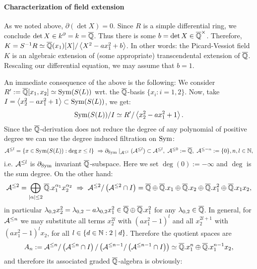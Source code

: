 \paragraph{Characterization of field extension}
\bn
\item As we noted above, $\partial(\det X) = 0$. Since $R$ is a simple differential ring, we conclude $\det X \in k^\partial = k = \overline{\mathbb{Q}}$. Thus there is some $b = \det X \in \overline{\mathbb{Q}}^\times$. Therefore, $K = S^{-1}R \simeq \overline{\mathbb{Q}}(x_1)[X]/\left<X^2 - a x_1^2 + b\right>$. In other words: the Picard-Vessiot field $K$ is an algebraic extension of (some appropriate) transcendental extension of $\overline{\mathbb{Q}}$. Rescaling our differential equation, we may assume that $b = 1$.
\item An immediate consequence of the above is the following: We consider $R' := \overline{\mathbb{Q}}[x_1,x_2] \simeq \mathrm{Sym}(S(L))$ wrt. the $\overline{\mathbb{Q}}$-basis $\{x_i : i = 1,2\}$. Now, take $I = \left<x_2^2 - a x_1^2 + 1\right> \subset \mathrm{Sym}(S(L))$, we get:
$$\mathrm{Sym}(S(L))/I \simeq R'/\left<x_2^2 - a x_1^2 + 1\right>.$$
Since the $\overline{\mathbb{Q}}$-derivation does not reduce the degree of any polynomial of positive degree we can use the degree induced filtration on $\mathrm{Sym}$:
$$\filteredA^{\leq l} = \left\{x \in \trm{Sym}(S(L)) : \deg x \leq l\right\} \ \RA \partial_{\trm{Sym}}\mid_{\filteredA^{\leq l}} (\filteredA^{\leq l}) \subset \filteredA^{\leq l},\ \filteredA^{\leq 0} := \currfield,\ \filteredA^{\leq -n} := \{0\}, n, l \in \nz,$$
i.e. $\mathcal{A}^{\leq l}$ is $\partial_{\mathrm{Sym}}$ invariant $\overline{\mathbb{Q}}$-subspace. Here we set $\deg(0) := -\infty$ and $\deg$ is the sum degree. On the other hand:
$$\mathcal{A}^{\leq 2} = \bigoplus_{|\alpha| \leq 2} \overline{\mathbb{Q}}.x_1^{\alpha_1} x_2^{\alpha_2}\ \Rightarrow\ \mathcal{A}^{\leq2} / \left(\mathcal{A}^{\leq2} \cap I\right) = \overline{\mathbb{Q}} \oplus \overline{\mathbb{Q}}.x_1 \oplus \overline{\mathbb{Q}}.x_2 \oplus \overline{\mathbb{Q}}.x_1^2 \oplus \overline{\mathbb{Q}}.x_1 x_2,$$
in particular $\lambda_{0,2} x_2^2 = \lambda_{0,2} - a \lambda_{0,2} x_1^2 \in \overline{\mathbb{Q}} \oplus \overline{\mathbb{Q}}.x_1^2$ for any $\lambda_{0,2} \in \overline{\mathbb{Q}}$. In general, for $\mathcal{A}^{\leq n}$ we may substitute all terms $x_2^{2 l}$ with $(a x_1^2 - 1)^l$ and all $x_2^{2l + 1}$ with $(a x_1^2 - 1)^l x_2$, for all $l \in \{d \in \mathbb{N} : 2 \mid d\}$. Therefore the quotient spaces are
$$A_n := \mathcal{A}^{\leq n}/ \left(\mathcal{A}^{\leq n} \cap I\right) /\left(\mathcal{A}^{\leq n - 1} / \left(\mathcal{A}^{\leq n - 1} \cap I\right) \right)\simeq \overline{\mathbb{Q}}.x_1^n \oplus \overline{\mathbb{Q}}.x_1^{n-1} x_2,$$
and therefore its associated graded $\overline{\mathbb{Q}}$-algebra is obviously:
